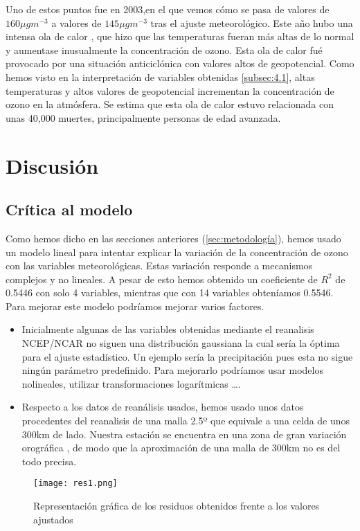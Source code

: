 \documentclass[12pt]{article}
\begin{document}
Uno de estos puntos fue en 2003,en el  que vemos cómo se pasa de valores de  $160 \mu g m^{-3}$ a valores de  $145 \mu g m^{-3}$ tras el ajuste meteorológico. Este año hubo una intensa ola de calor \citep{schar2004}, que hizo que las temperaturas fueran más altas de lo normal y aumentase inusualmente la concentración de ozono. Esta ola de calor fué provocado por una situación anticiclónica con  valores altos de geopotencial. Como hemos visto en la interpretación de variables obtenidas \ref{subsec:4.1}, altas temperaturas y altos valores de geopotencial incrementan la concentración de ozono en la atmósfera. Se estima que esta ola de calor \citep{ricardo2010} estuvo relacionada con  unas 40,000 muertes, principalmente personas de edad avanzada.
\newpage






\section{Discusión}



\subsection{Crítica al modelo}
Como hemos dicho en las secciones anteriores (\ref{sec:metodología}), hemos usado un modelo lineal para intentar explicar la variación de la concentración de ozono con  las variables meteorológicas. Estas variación responde a  mecanismos complejos y no lineales. A pesar de esto hemos obtenido un coeficiente de $R^2$ de 0.5446 con solo 4 variables, mientras que con 14 variables obteníamos 0.5546.  Para mejorar este modelo podríamos mejorar varios factores.
\begin{itemize}


\item Inicialmente algunas de las variables  obtenidas mediante el reanalisis NCEP/NCAR no siguen una distribución gaussiana la cual sería la óptima para el ajuste estadístico. Un ejemplo sería la precipitación pues esta no sigue ningún parámetro predefinido. Para mejorarlo podríamos usar modelos nolineales, utilizar transformaciones logarítmicas \ldots. \citep{wilks}

\item Respecto a los datos de reanálisis usados, hemos usado unos datos procedentes del reanalisis de una malla 2.5º que equivale a una celda  de unos 300km de lado. Nuestra estación se encuentra en una zona de gran variación orográfica \citep{andre}, de modo que la aproximación de una malla de 300km no es del todo precisa. 
\end{itemize}
\begin{figure}[h]
\centering
    \texttt{[image: res1.png]}
    \caption[Residuos frente a valores ajustados]{Representación gráfica de los residuos obtenidos frente a los valores ajustados} \label{res1}
\end{figure}
\end{document}
